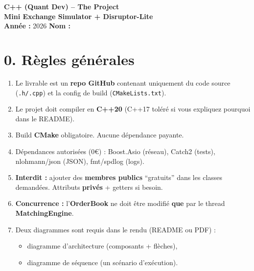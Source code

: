 \documentclass[11pt,a4paper]{article}
\begin{document}
\begin{center}
{\Large \textbf{C++ (Quant Dev) -- The Project}}\\
\vspace{0.2em}
{\large \textbf{Mini Exchange Simulator + Disruptor-Lite}}\\
\vspace{0.6em}
\textbf{Année :} 2026 \hfill \textbf{Nom :} \underline{\hspace{7cm}}\\
\vspace{0.2em}
\end{center}

\section*{0. Règles générales}
\begin{enumerate}
  \item Le livrable est un \textbf{repo GitHub} contenant uniquement du code source (\texttt{.h/.cpp}) et la config de build (\texttt{CMakeLists.txt}).
  \item Le projet doit compiler en \textbf{C++20} (C++17 toléré si vous expliquez pourquoi dans le README).
  \item Build \textbf{CMake} obligatoire. Aucune dépendance payante.
  \item Dépendances autorisées (0€) : Boost.Asio (réseau), Catch2 (tests), nlohmann/json (JSON), fmt/spdlog (logs).
  \item \textbf{Interdit :} ajouter des \textbf{membres publics} “gratuits” dans les classes demandées. Attributs \textbf{privés} + getters si besoin.
  \item \textbf{Concurrence :} l'\textbf{OrderBook} ne doit être modifié \textbf{que} par le thread \textbf{MatchingEngine}.
  \item Deux diagrammes sont requis dans le rendu (README ou PDF) :
    \begin{itemize}
      \item diagramme d’architecture (composants + flèches),
      \item diagramme de séquence (un scénario d’exécution).
    \end{itemize}
\end{enumerate}

\end{document}
